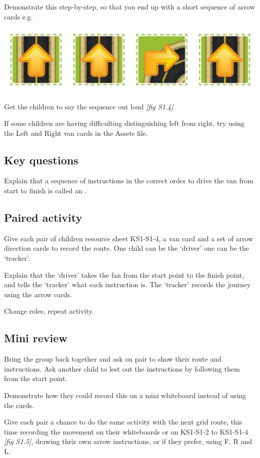 \documentclass{../../../lessonplan}
\begin{document}
\begin{lessonplan}
Demonstrate this step-by-step, so that you end up with a short sequence of arrow cards e.g.\

\includegraphics[width=.667\linewidth]{arrow_cards.jpg}

Get the children to say the sequence out loud \textit{[fig S1.4]}.  

If some children are having difficulting distinguishing left from right, try using the Left and Right van cards in the Assets file.


\subsection*{Key questions}



Explain that a sequence of instructions in the correct order to drive the van from start to finish is called an .


\subsection*{Paired activity}

Give each pair of children resource sheet KS1-S1-4, a van card and a set of arrow direction cards to record the route.
One child can be the `driver' one can be the `tracker'.

Explain that the `driver' takes the fan from the start point to the finish point, and tells the `tracker' what each instruction is.
The `tracker' records the journey using the arrow cards.

Change roles, repeat activity.



\subsection*{Mini review}

Bring the group back together and ask on pair to show their route and instructions.
Ask another child to lest out the instructions by following them from the start point.

Demonstrate how they could record this on a mini whiteboard instead of using the cards.

Give each pair a chance to do the same activity with the next grid route, this time recording the movement on their whiteboards or on KS1-S1-2 to KS1-S1-4 \textit{[fig S1.5]}, drawing their own arrow instructions, or if they prefer, using F, R and L.


\end{lessonplan}
\end{document}
